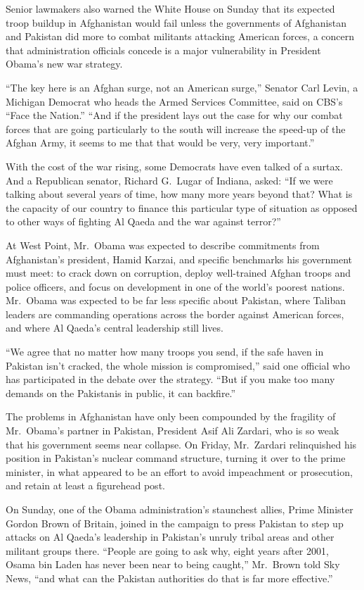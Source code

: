 ﻿\documentclass[12pt]{article}
\begin{document}
Senior lawmakers also warned the White House on Sunday that its expected troop buildup in
Afghanistan would fail unless the governments of Afghanistan and Pakistan did more to combat
militants attacking American forces, a concern that administration officials concede is a major
vulnerability in President Obama's new war strategy.

``The key here is an Afghan surge, not an American surge,'' Senator Carl Levin, a Michigan Democrat
who heads the Armed Services Committee, said on CBS's ``Face the Nation.'' ``And if the president
lays out the case for why our combat forces that are going particularly to the south will increase
the speed-up of the Afghan Army, it seems to me that that would be very, very important.''

With the cost of the war rising, some Democrats have even talked of a surtax. And a Republican
senator, Richard G.~Lugar of Indiana, asked: ``If we were talking about several years of time, how
many more years beyond that? What is the capacity of our country to finance this particular type of
situation as opposed to other ways of fighting Al Qaeda and the war against terror?''

At West Point, Mr.~Obama was expected to describe commitments from Afghanistan's president, Hamid
Karzai, and specific benchmarks his government must meet: to crack down on corruption, deploy
well-trained Afghan troops and police officers, and focus on development in one of the world's
poorest nations. Mr.~Obama was expected to be far less specific about Pakistan, where Taliban
leaders are commanding operations across the border against American forces, and where Al Qaeda's
central leadership still lives.

``We agree that no matter how many troops you send, if the safe haven in Pakistan isn't cracked, the
whole mission is compromised,'' said one official who has participated in the debate over the
strategy. ``But if you make too many demands on the Pakistanis in public, it can backfire.''

The problems in Afghanistan have only been compounded by the fragility of Mr.~Obama's partner in
Pakistan, President Asif Ali Zardari, who is so weak that his government seems near collapse. On
Friday, Mr.~Zardari relinquished his position in Pakistan's nuclear command structure, turning it
over to the prime minister, in what appeared to be an effort to avoid impeachment or prosecution,
and retain at least a figurehead post.

On Sunday, one of the Obama administration's staunchest allies, Prime Minister Gordon Brown of
Britain, joined in the campaign to press Pakistan to step up attacks on Al Qaeda's leadership in
Pakistan's unruly tribal areas and other militant groups there. ``People are going to ask why, eight
years after 2001, Osama bin Laden has never been near to being caught,'' Mr.~Brown told Sky News,
``and what can the Pakistan authorities do that is far more effective.''
\end{document}
